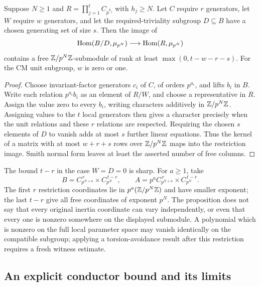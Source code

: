 \begin{proposition}\label{spn:prop:grid}
Suppose $N\ge1$ and $R=\prod_{j=1}^tC_{p^{h_j}}$ with $h_j\ge N$. Let $C$
require $r$ generators, let $W$ require $w$ generators, and let the
required-triviality subgroup $D\subseteq B$ have a chosen generating set of
size $s$. Then the image of
\[
 \operatorname{Hom}(B/D,\mu_{p^N})\longrightarrow\operatorname{Hom}(R,\mu_{p^N})
\]
contains a free $\mathbb{Z}/p^N\mathbb{Z}$-submodule of rank at least $\max(0,t-w-r-s)$. For
the CM unit subgroup, $w$ is zero or one.
\end{proposition}

\begin{proof}
Choose invariant-factor generators $c_i$ of $C$, of orders $p^{a_i}$, and
lifts $b_i$ in $B$. Write each relation $p^{a_i}b_i$ as an element of $R/W$,
and choose a representative in $R$. Assign the value zero to every $b_i$,
writing characters additively in $\mathbb{Z}/p^N\mathbb{Z}$. Assigning values to the $t$
local generators then gives a character precisely when the unit relations and
these $r$ relations are respected. Requiring the chosen $s$ elements of $D$
to vanish adds at most $s$ further linear equations. Thus the kernel of a
matrix with at most $w+r+s$ rows over $\mathbb{Z}/p^N\mathbb{Z}$ maps into the restriction
image. Smith normal form leaves at least the asserted number of free
columns.
\end{proof}

The bound $t-r$ in the case $W=D=0$ is sharp. For $a\ge1$, take
\[
 B=C_{p^{N+a}}^{\,r}\times C_{p^N}^{\,t-r},\qquad
 A=p^aC_{p^{N+a}}^{\,r}\times C_{p^N}^{\,t-r}.
\]
The first $r$ restriction coordinates lie in $p^a(\mathbb{Z}/p^N\mathbb{Z})$ and have smaller
exponent; the last $t-r$ give all free coordinates of exponent $p^N$. The
proposition does not say that every original inertia coordinate can vary
independently, or even that every one is nonzero somewhere on the displayed
submodule. A polynomial which is nonzero on the full local parameter space
may vanish identically on the compatible subgroup; applying a
torsion-avoidance result after this restriction requires a fresh witness
estimate.


\subsection{An explicit conductor bound and its limits}\label{spn:sec:conductor}

